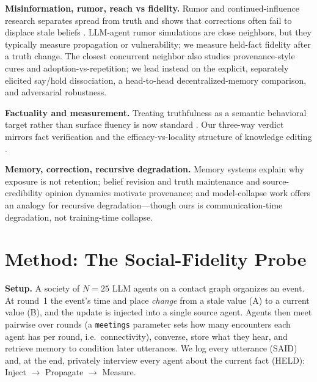 \documentclass[letterpaper]{article} %
\begin{document}
\textbf{Misinformation, rumor, reach vs fidelity.} Rumor and continued-influence research
separates spread from truth and shows that corrections often fail to displace stale beliefs
\citep{lewandowsky2012misinformation,thorson2016belief}. LLM-agent rumor simulations are close
neighbors, but they typically measure propagation or vulnerability; we measure held-fact
fidelity after a truth change. The closest concurrent neighbor \citep{xie2026spark} also
studies provenance-style cures and adoption-vs-repetition; we lead instead on the explicit,
separately elicited say/hold dissociation, a head-to-head decentralized-memory comparison, and
adversarial robustness.

\textbf{Factuality and measurement.} Treating truthfulness as a semantic behavioral target
rather than surface fluency is now standard \citep{lin2022truthfulqa,manakul2023selfcheckgpt,
farquhar2024detecting}. Our three-way verdict mirrors fact verification
\citep{thorne2018fever} and the efficacy-vs-locality structure of knowledge editing
\citep{meng2022rome,meng2023memit}.

\textbf{Memory, correction, recursive degradation.} Memory systems
\citep{chhikara2025mem0,xu2025amem,zhong2024memorybank} explain why exposure is not retention;
belief revision and truth maintenance \citep{alchourron1985logic,doyle1979truth} and
source-credibility opinion dynamics \citep{degroot1974reaching} motivate provenance; and
model-collapse work \citep{shumailov2023curse} offers an analogy for recursive
degradation---though ours is communication-time degradation, not training-time collapse.

\section{Method: The Social-Fidelity Probe}
\textbf{Setup.} A society of $N{=}25$ LLM agents on a contact graph organizes an event. At
round~1 the event's time and place \emph{change} from a stale value (A) to a current value (B),
and the update is injected into a single source agent. Agents then meet pairwise over rounds (a
\texttt{meetings} parameter sets how many encounters each agent has per round, i.e.\
connectivity), converse, store what they hear, and retrieve memory to condition later
utterances. We log every utterance (SAID) and, at the end, privately interview every agent
about the current fact (HELD): Inject $\rightarrow$ Propagate $\rightarrow$ Measure.
\end{document}

